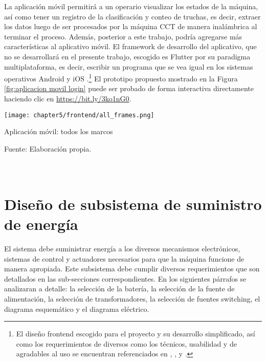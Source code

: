 La aplicación móvil permitirá a un operario visualizar los estados de la máquina, así como tener un registro de la clasificación y conteo de truchas, es decir, extraer los datos luego de ser procesados por la máquina CCT de manera inalámbrica al terminar el proceso. Además, posterior a este trabajo, podría agregarse más características al aplicativo móvil. El framework de desarrollo del aplicativo, que no se desarrollará en el presente trabajo, escogido es Flutter por su paradigma multiplataforma, es decir, escribir un programa que se vea igual en los sistemas operativos Android y iOS \cite{Simone2020}.\footnote{El diseño frontend escogido para el proyecto y su desarrollo simplificado, así como los requerimientos de diversos como los técnicos, usabilidad y de agradables al uso se encuentran referenciados en \cite{Joekman2010}, \cite{PrajyotMainkar2019}, \cite{Churchill2016} y \cite{Neil2012}.} El prototipo propuesto mostrado en la Figura \ref{fig:aplicacion movil login} puede ser probado de forma interactiva directamente haciendo clic en \href{https://bit.ly/3ko1nG0}{https://bit.ly/3ko1nG0}.

\begin{myfigure}[H]
	\footnotesize\centering
	\texttt{[image: chapter5/frontend/all\_frames.png]}
	\caption{Aplicación móvil: todos los marcos}
	\begin{myflushcenter}
		Fuente: Elaboración propia.
	\end{myflushcenter}
	\label{fig:aplicacion movil login}
\end{myfigure}

\pagestyle{myportland}
\doublespacing
\chapter[\quad\quad\quad\quad ----- Diseño de subsistema de suministro de energía]{\\ Diseño de subsistema de suministro de energía}
\thispagestyle{myportland}
\label{ssec:diseno de subsistema de suministro de energia}

El sistema debe suministrar energía a los diversos mecanismos electrónicos, sistemas de control y actuadores necesarios para que la máquina funcione de manera apropiada. Este subsistema debe cumplir diversos requerimientos que son detallados en las sub-secciones correspondientes. En los siguientes párrafos se analizaran a detalle: la selección de la batería, la selección de la fuente de alimentación, la selección de transformadores, la selección de fuentes switching, el diagrama esquemático y el diagrama eléctrico.

